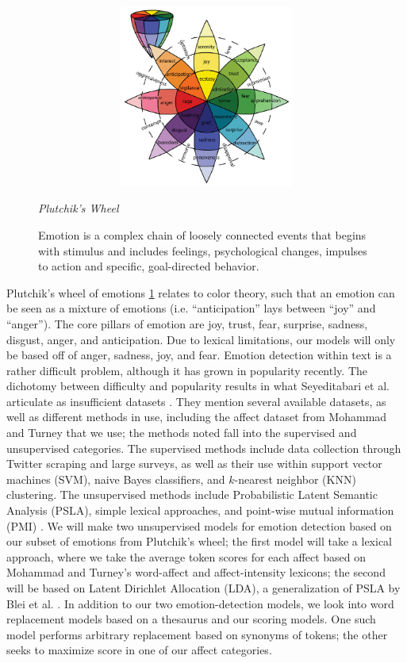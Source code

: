 \documentclass[11pt, twoside, reqno]{book}
\begin{document}
\begin{figure}[h!]
  \centering
  \includegraphics[width=15cm, height=6cm, keepaspectratio]{plutchikWheel.png}

  {\small \textit{Plutchik's Wheel} \cite{Plutchik7:online}}
  \caption{
    Emotion is a complex chain of loosely connected events that begins with stimulus and includes feelings, psychological changes, impulses to action and specific, goal-directed behavior. \cite{10.2307/27857503}
  }
  \label{fig:wheel}
\end{figure}


Plutchik's wheel of emotions \ref{fig:wheel} relates to color theory, such that an emotion can be seen as a mixture of emotions (i.e. ``anticipation'' lays between ``joy'' and ``anger''). The core pillars of emotion are joy, trust, fear, surprise, sadness, disgust, anger, and anticipation. Due to lexical limitations, our models will only be based off of anger, sadness, joy, and fear. Emotion detection within text is a rather difficult problem, although it has grown in popularity recently. The dichotomy between difficulty and popularity results in what Seyeditabari et al. articulate as insufficient datasets \cite{DBLP:journals/corr/abs-1806-00674}. They mention several available datasets, as well as different methods in use, including the affect dataset from Mohammad and Turney \cite{Mohammad13} that we use; the methods noted fall into the supervised and unsupervised categories. The supervised methods include data collection through Twitter scraping and large surveys, as well as their use within support vector machines (SVM), naive Bayes classifiers, and $k$-nearest neighbor (KNN) clustering. The unsupervised methods include Probabilistic Latent Semantic Analysis (PSLA), simple lexical approaches, and point-wise mutual information (PMI) \cite{DBLP:journals/corr/abs-1806-00674}. We will make two unsupervised models for emotion detection based on our subset of emotions from Plutchik's wheel; the first model will take a lexical approach, where we take the average token scores for each affect based on Mohammad and Turney's word-affect and affect-intensity lexicons; the second will be based on Latent Dirichlet Allocation (LDA), a generalization of PSLA by Blei et al. \cite{david_m._y._i._1970}. In addition to our two emotion-detection models, we look into word replacement models based on a thesaurus \cite{BigHugeT88:online} and our scoring models. One such model performs arbitrary replacement based on synonyms of tokens; the other seeks to maximize score in one of our affect categories.
\end{document}
